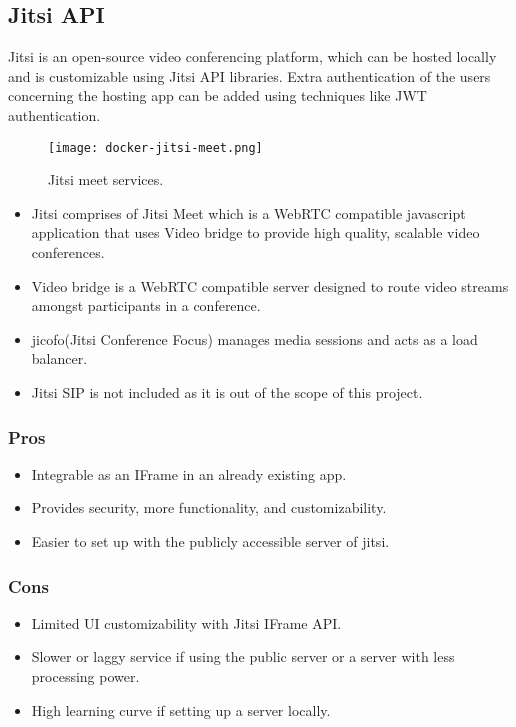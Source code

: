 \subsection{Jitsi API}
Jitsi is an open-source video conferencing platform, which can be hosted locally and is customizable using Jitsi API libraries.
Extra authentication of the users concerning the hosting app can be added using techniques like JWT authentication.

\begin{figure}[h!]
    \begin{center}
        \texttt{[image: docker-jitsi-meet.png]}
    \end{center}
    \caption{Jitsi meet services.}
    \label{fig:jitsimeet}
\end{figure}

\begin{itemize}
    \item  Jitsi comprises of Jitsi Meet which is a WebRTC compatible javascript application that uses Video bridge to provide high quality, scalable video conferences.
    \item Video bridge is a WebRTC compatible server designed to route video streams amongst participants in a conference.
    \item jicofo(Jitsi Conference Focus) manages media sessions and acts as a load balancer.
    \item Jitsi SIP is not included as it is out of the scope of this project.
\end{itemize}

\subsubsection{Pros}

\begin{itemize}
    \item Integrable as an IFrame in an already existing app.
    \item Provides security, more functionality, and customizability.
    \item Easier to set up with the publicly accessible server of jitsi.
\end{itemize}

\subsubsection{Cons}

\begin{itemize}
    \item Limited UI customizability with Jitsi IFrame API.
    \item Slower or laggy service if using the public server or a server with less processing power.
    \item High learning curve if setting up a server locally.
\end{itemize}